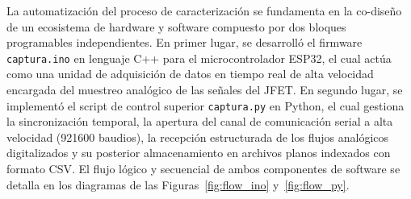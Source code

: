 \documentclass[conference]{IEEEtran}
\begin{document}
La automatización del proceso de caracterización se fundamenta en la co-diseño
de un ecosistema de hardware y software compuesto por dos bloques programables
independientes. En primer lugar, se desarrolló el firmware \texttt{captura.ino}
en lenguaje C++ para el microcontrolador ESP32, el cual actúa como una unidad
de adquisición de datos en tiempo real de alta velocidad encargada del muestreo
analógico de las señales del JFET\@. En segundo lugar, se implementó el script
de control superior \texttt{captura.py} en Python, el cual gestiona la
sincronización temporal, la apertura del canal de comunicación serial a alta
velocidad (\num{921600} baudios), la recepción estructurada de los flujos
analógicos digitalizados y su posterior almacenamiento en archivos planos
indexados con formato CSV\@. El flujo lógico y secuencial de ambos componentes
de software se detalla en los diagramas de las Figuras~\ref{fig:flow_ino}
y~\ref{fig:flow_py}.
\end{document}
